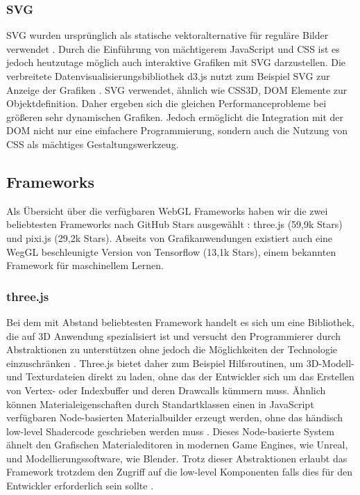 \subsubsection*{\ac{SVG}}
\ac{SVG} wurden ursprünglich als statische vektoralternative für reguläre Bilder verwendet \cite{quint2003scalable}. Durch die Einführung von mächtigerem JavaScript und CSS ist es jedoch heutzutage möglich auch interaktive Grafiken mit SVG darzustellen. Die verbreitete Datenvisualisierungsbibliothek d3.js nutzt zum Beispiel SVG zur Anzeige der Grafiken \cite{d3info}. SVG verwendet, ähnlich wie CSS3D, \ac{DOM} Elemente zur Objektdefinition. Daher ergeben sich die gleichen Performanceprobleme bei größeren \bzw sehr dynamischen Grafiken. Jedoch ermöglicht die Integration mit der \ac{DOM} nicht nur eine einfachere Programmierung, sondern auch die Nutzung von CSS als mächtiges Gestaltungswerkzeug.
\subsection{Frameworks}
Als Übersicht über die verfügbaren WebGL Frameworks haben wir die zwei beliebtesten Frameworks nach GitHub Stars ausgewählt \cite{githubRanking}: three.js (59,9k Stars) und pixi.js (29,2k Stars). Abseits von Grafikanwendungen existiert auch eine WegGL beschleunigte Version von Tensorflow (13,1k Stars), einem bekannten Framework für maschinellem Lernen.
\subsubsection*{three.js}\cite{threejsGithub} Bei dem mit Abstand beliebtesten Framework handelt es sich um eine Bibliothek, die auf 3D Anwendung spezialisiert ist und versucht den Programmierer durch Abstraktionen zu unterstützen ohne jedoch die Möglichkeiten der Technologie einzuschränken \cite{threejsGithub}. Three.js bietet daher zum Beispiel Hilfsroutinen, um 3D-Modell- und Texturdateien direkt zu laden, ohne das der Entwickler sich um das Erstellen von Vertex- oder Indexbuffer und deren Drawcalls kümmern muss. Ähnlich können Materialeigenschaften durch Standartklassen \bzw einen in JavaScript verfügbaren Node-basierten Materialbuilder erzeugt werden, ohne das händisch low-level Shadercode geschrieben werden muss \cite{threeJSNodes}. Dieses Node-basierte System ähnelt den Grafischen Materialeditoren in modernen Game Engines, wie \zb Unreal, und Modellierungssoftware, wie \zb Blender. Trotz dieser Abstraktionen erlaubt das Framework trotzdem den Zugriff auf die low-level Komponenten falls dies für den Entwickler erforderlich sein sollte \cite{threeJSShaders}.
